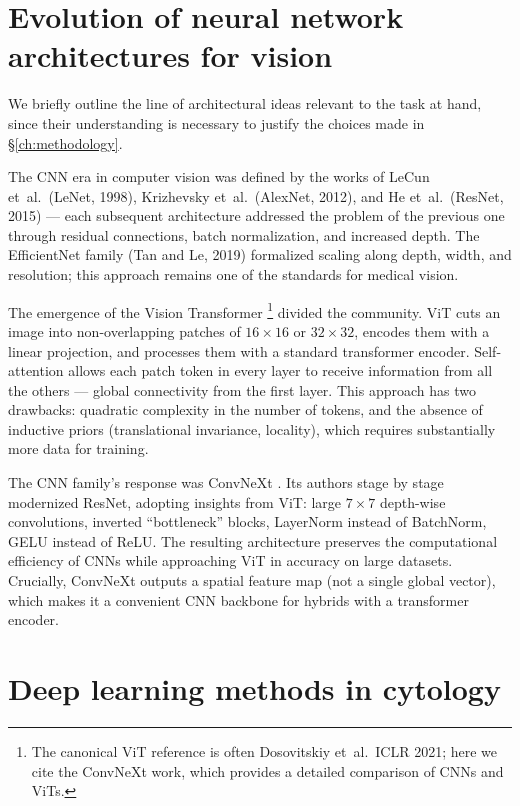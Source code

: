 \documentclass[14pt,a4paper]{extreport}
\begin{document}
\section{Evolution of neural network architectures for vision}

We briefly outline the line of architectural ideas relevant to the task
at hand, since their understanding is necessary to justify the choices
made in \S\ref{ch:methodology}.

The CNN era in computer vision was defined by the works of LeCun et~al.\
(LeNet, 1998), Krizhevsky et~al.\ (AlexNet, 2012), and He et~al.\
(ResNet, 2015) --- each subsequent architecture addressed the problem of
the previous one through residual connections, batch normalization, and
increased depth. The EfficientNet family (Tan and Le, 2019) formalized
scaling along depth, width, and resolution; this approach remains one of
the standards for medical vision.

The emergence of the Vision Transformer \cite{liu2022convnext}\footnote{The
canonical ViT reference is often Dosovitskiy et~al.\ ICLR 2021; here we
cite the ConvNeXt work, which provides a detailed comparison of CNNs and
ViTs.} divided the community. ViT cuts an image into non-overlapping
patches of $16 \times 16$ or $32 \times 32$, encodes them with a linear
projection, and processes them with a standard transformer encoder.
Self-attention allows each patch token in every layer to receive
information from all the others --- global connectivity from the first
layer. This approach has two drawbacks: quadratic complexity in the
number of tokens, and the absence of inductive priors (translational
invariance, locality), which requires substantially more data for
training.

The CNN family's response was ConvNeXt \cite{liu2022convnext}. Its
authors stage by stage modernized ResNet, adopting insights from ViT:
large $7 \times 7$ depth-wise convolutions, inverted ``bottleneck''
blocks, LayerNorm instead of BatchNorm, GELU instead of ReLU. The
resulting architecture preserves the computational efficiency of CNNs
while approaching ViT in accuracy on large datasets. Crucially, ConvNeXt
outputs a spatial feature map (not a single global vector), which makes
it a convenient CNN backbone for hybrids with a transformer encoder.

\section{Deep learning methods in cytology}
\end{document}
